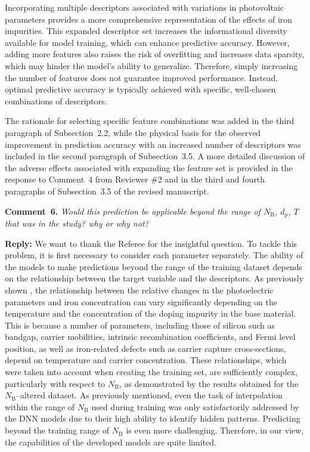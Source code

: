 \documentclass[a4paper,fleqn]{cas-sc}
\begin{document}
Incorporating multiple descriptors associated with variations in photovoltaic parameters provides
a more comprehensive representation of the effects of iron impurities.
This expanded descriptor set increases the informational diversity available for model training, which can enhance predictive accuracy.
However, adding more features also raises the risk of overfitting and increases data sparsity,
which may hinder the model's ability to generalize.
Therefore, simply increasing the number of features does not guarantee improved performance.
Instead, optimal predictive accuracy is typically achieved with specific, well-chosen combinations of descriptors.

The rationale for selecting specific feature combinations was added in the third paragraph of Subsection~2.2,
while the physical basis for the observed improvement in prediction accuracy with an increased number of descriptors
was included in the second paragraph of Subsection~3.5.
A more detailed discussion of the adverse effects associated with expanding the feature set
is provided in the response to Comment~4 from Reviewer \#2 and in the third and fourth paragraphs of Subsection~3.5
of the revised manuscript.


\vspace{1cm}
\noindent
\textcolor[rgb]{0.00,0.50,1.00}{\textbf{Comment~6.}}
\emph{Would this prediction be applicable beyond the range of $N_\mathrm{B}$, $d_p$, $T$ that was in the study? why or why not?}

\noindent
\textcolor[rgb]{0.51,0.00,0.00}{\textbf{Reply:}}
We want to thank the Referee for the insightful question.
To tackle this problem, it is first necessary to consider each parameter separately.
The ability of the models to make predictions beyond the range of the training dataset
depends on the relationship between the target variable and the descriptors.
As previously shown \cite{Olikh2025MSEB}, the relationship between the relative changes in the photoelectric parameters
and iron concentration can vary significantly depending on the temperature and the concentration of the doping impurity in the base material.
This is because a number of parameters, including those of silicon such as bandgap, carrier mobilities,
intrinsic recombination coefficients, and Fermi level position,
as well as iron-related defects such as carrier capture cross-sections, depend on temperature and carrier concentration.
These relationships, which were taken into account when creating the training set, are sufficiently complex,
particularly with respect to $N_\mathrm{B}$, as demonstrated by the results obtained for the $N_\mathrm{B}$--altered dataset.
As previously mentioned, even the task of interpolation within the range of $N_\mathrm{B}$ used during training
was only satisfactorily addressed by the DNN models due to their high ability to identify hidden patterns.
Predicting beyond the training range of $N_\mathrm{B}$ is even more challenging.
Therefore, in our view, the capabilities of the developed models are quite limited.
\end{document}
